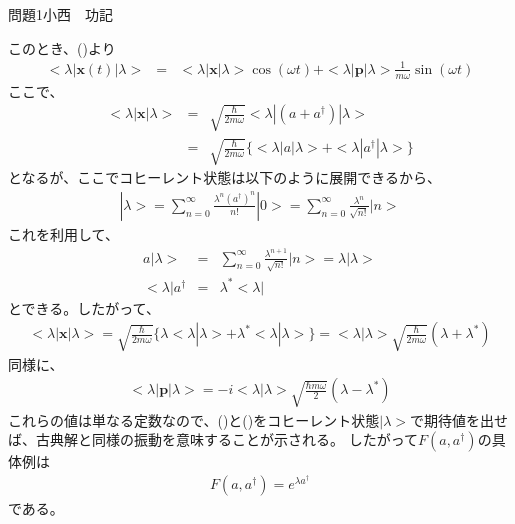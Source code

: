 \documentclass[fleqn]{jbook}
\begin{document}
\begin{answer}{問題1}{小西　功記}
\begin{enumerate}
このとき、()より
\begin{eqnarray}
<\lambda|\mathbf{x}(t)|\lambda>&=&<\lambda|\mathbf{x}|\lambda>\cos(\omega t)+<\lambda|\mathbf{p}|\lambda>\frac{1}{m\omega}\sin(\omega t)
\end{eqnarray}
ここで、
\begin{eqnarray}
<\lambda|\mathbf{x}|\lambda>&=&\sqrt{\frac{\hbar}{2m\omega}}<\lambda|(a+a^\dag)|\lambda>\\
&=&\sqrt{\frac{\hbar}{2m\omega}}\{<\lambda|a|\lambda>+<\lambda|a^\dag|\lambda>\}
\end{eqnarray}
となるが、ここでコヒーレント状態は以下のように展開できるから、
\begin{eqnarray}
|\lambda>=\sum_{n=0}^\infty \frac{\lambda^n(a^\dag)^n}{n!}|0>=\sum_{n=0}^\infty \frac{\lambda^n}{\sqrt{n!}}|n>
\end{eqnarray}
これを利用して、
\begin{eqnarray}
a|\lambda>&=&\sum_{n=0}^\infty \frac{\lambda^{n+1}}{\sqrt{n!}}|n>=\lambda|\lambda>\\
<\lambda|a^\dag&=&\lambda^*<\lambda|
\end{eqnarray}
とできる。したがって、
\begin{eqnarray}
<\lambda|\mathbf{x}|\lambda>=\sqrt{\frac{\hbar}{2m\omega}}\{\lambda<\lambda|\lambda>+\lambda^*<\lambda|\lambda>\}=<\lambda|\lambda>\sqrt{\frac{\hbar}{2m\omega}}(\lambda+\lambda^*)
\end{eqnarray}
同様に、
\begin{eqnarray}
<\lambda|\mathbf{p}|\lambda>=-i<\lambda|\lambda>\sqrt{\frac{\hbar m\omega}{2}}(\lambda-\lambda^*)
\end{eqnarray}
これらの値は単なる定数なので、()と()をコヒーレント状態$|\lambda>$で期待値を出せば、古典解と同様の振動を意味することが示される。
したがって$F(a,a^\dagger)$の具体例は
\begin{eqnarray}
F(a,a^\dagger)=e^{\lambda a^\dag}
\end{eqnarray}
である。
\end{enumerate}
\end{answer}
\end{document}
